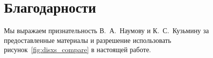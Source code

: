 \section*{Благодарности}
Мы выражаем признательность В.~А.~Наумову и К.~С.~Кузьмину за предоставленные материалы и разрешение использовать рисунок~\ref{fig:disxs_compare} в настоящей работе.